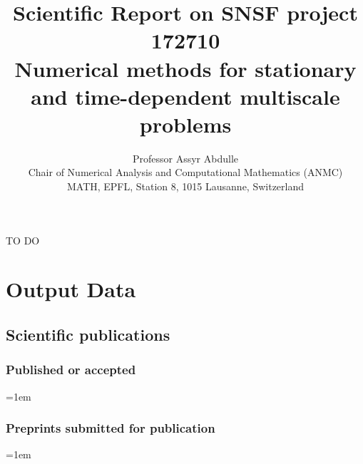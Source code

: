 \documentclass[10pt]{article}
\title{Scientific Report on SNSF project 172710 \\ Numerical methods for stationary and time-dependent multiscale problems}
\author{Professor Assyr Abdulle \\
	Chair of Numerical Analysis and Computational Mathematics (ANMC) \\
	MATH, EPFL, Station 8, 1015 Lausanne, Switzerland
}
\date{}
\begin{document}
	
\maketitle	

{\color{red} TO DO}




\clearpage
\section{Output Data}

\subsection{Scientific publications}

\subsubsection*{Published or accepted}

\sloppy
\emergencystretch=1em
\begin{enumerate}[label={[\arabic*]}]
	\item {}
	\item {}
	\item {}
	\item {}
	\item {}
	\item {}
	\item {}
	\item {}
	\item {}
	\item {}
	\item {}
\end{enumerate}

\subsubsection*{Preprints submitted for publication}

\sloppy
\emergencystretch=1em
\begin{enumerate}[label={[\arabic*]}]
	\item {}
	\item {}
	\item {}
	\item {}
	\item {}
	\item {}
	\item {}
	\item {}
	\item {}
	\item {}
	\item {}
	\item {}
	\item {}
\end{enumerate}
\end{document}
